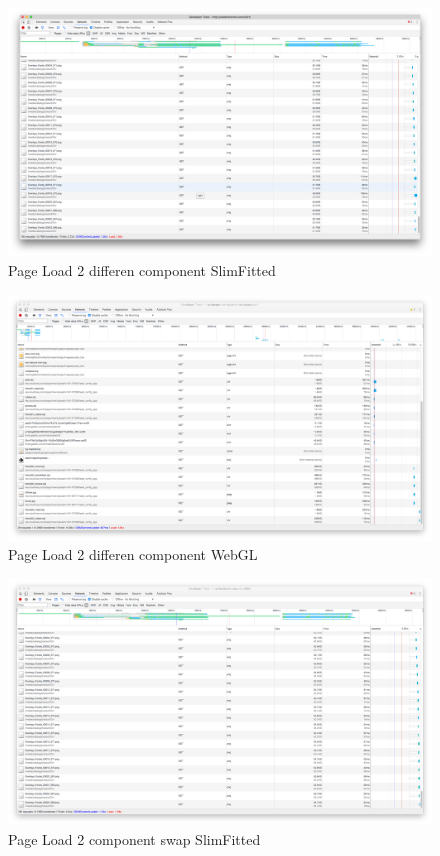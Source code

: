 \clearpage

\begin{figure}
\includegraphics[width=15cm]{images/2differentComponents}
\caption{Page Load 2 differen component SlimFitted}
\label{attachment:2differentComponents}
\end{figure}

\begin{figure}
\includegraphics[width=15cm]{images/2differentComponentsWebGL}
\caption{Page Load 2 differen component WebGL}
\label{attachment:2differentComponentsWebGL}
\end{figure}

\clearpage

\begin{figure}
\includegraphics[width=15cm]{images/2componentsSwap}
\caption{Page Load 2 component swap SlimFitted}
\label{attachment:2componentsSwap}
\end{figure}

